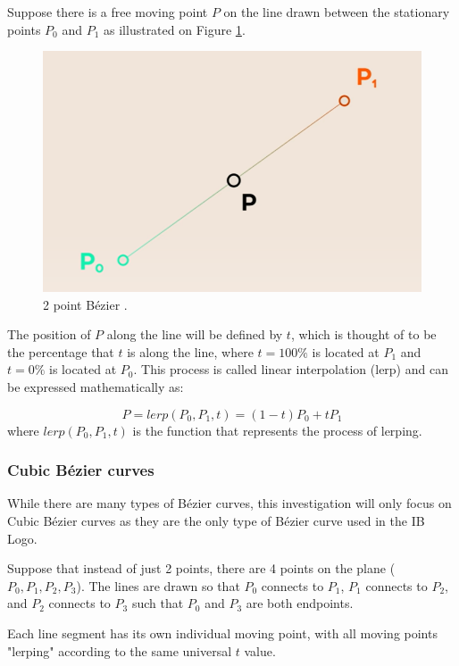 \documentclass[letterpaper, 12pt]{article}
\begin{document}
Suppose there is a free moving point \(P\) on the line drawn between
the stationary points \(P_0\) and \(P_1\) as illustrated on
Figure \ref*{fig:2_point_bezier}.

\begin{figure}[H]
    \centering
    \includegraphics[width=.8\textwidth]{2_point_bezier.png}
    \caption{2 point Bézier \protect\cite{holmerBeautyBezierCurves2021}.}
    \label{fig:2_point_bezier}
\end{figure}

The position of \(P\) along the line will be defined by \(t\), which
is thought of to be the percentage that \(t\) is along the line,
where \(t = 100\%\) is located at \(P_1\) and \(t = 0\%\) is located
at \(P_0\). This process is called linear interpolation (lerp) and
can be expressed mathematically as:

\begin{equation}
    P = lerp(P_0, P_1, t) = (1-t)P_0 + tP_1
    \label{eq:lerp_def}
\end{equation}
where \(lerp(P_0, P_1, t)\) is the function that represents the
process of lerping.


\subsubsection{Cubic Bézier curves}

While there are many types of Bézier curves, this investigation will
only focus on Cubic Bézier curves as they are the only type of Bézier curve used in the IB Logo.

Suppose that instead of just 2 points, there are 4 points on the
plane (\(P_0, P_1, P_2, P_3\)). The lines are drawn so that
\(P_0\) connects to \(P_1\), \(P_1\) connects to \(P_2\), and
\(P_2\) connects to \(P_3\) such that \(P_0\) and \(P_3\) are both
endpoints.

Each line segment has its own individual moving point, with all moving
points "lerping" according to the same universal \(t\) value.
\end{document}
